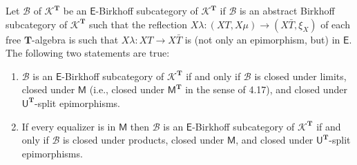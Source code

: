 Let $\mathcal{B}$ of $\mathcal{K}^{\mathbf{T}}$ be an $\mathsf{E}$-Birkhoff subcategory of $\mathcal{K}^{\mathbf{T}}$ if $\mathcal{B}$ is an abstract Birkhoff subcategory of $\mathcal{K}^{\mathbf{T}}$ such that the reflection $X\lambda : (XT, X\mu) \to (X\bar{T}, \xi_X)$ of each free $\mathbf{T}$-algebra is such that $X\lambda : XT \to X\bar{T}$ is (not only an epimorphism, but) in $\mathsf{E}$. The following two statements are true:

\begin{enumerate}
\item $\mathcal{B}$ is an $\mathsf{E}$-Birkhoff subcategory of $\mathcal{K}^{\mathbf{T}}$ if and only if $\mathcal{B}$ is closed under limits, closed under $\mathsf{M}$ (i.e., closed under $\mathsf{M}^{\mathbf{T}}$ in the sense of 4.17), and closed under $\mathsf{U}^{\mathbf{T}}$-split epimorphisms.

\item If every equalizer is in $\mathsf{M}$ then $\mathcal{B}$ is an $\mathsf{E}$-Birkhoff subcategory of $\mathcal{K}^{\mathbf{T}}$ if and only if $\mathcal{B}$ is closed under products, closed under $\mathsf{M}$, and closed under $\mathsf{U}^{\mathbf{T}}$-split epimorphisms.
\end{enumerate}
